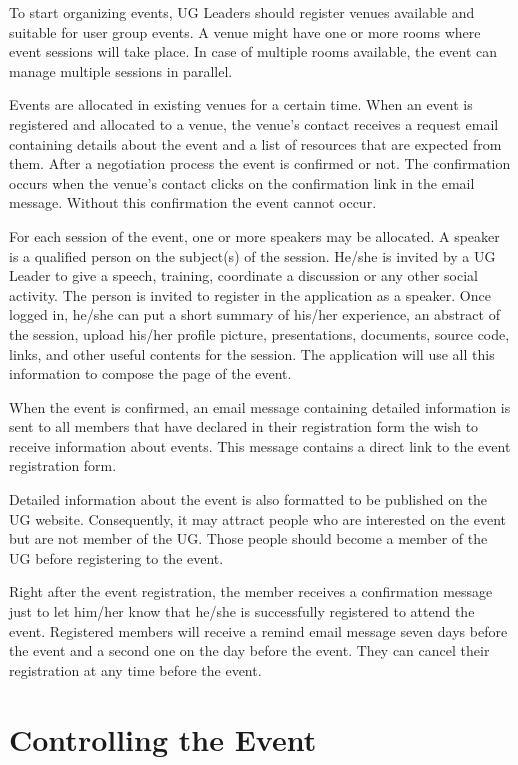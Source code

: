 \documentclass[envcountsame,envcountchap]{svmono}
\begin{document}
To start organizing events, UG Leaders should register venues available and suitable for user group events. A venue might have one or more rooms where event sessions will take place. In case of multiple rooms available, the event can manage multiple sessions in parallel.

Events are allocated in existing venues for a certain time. When an event is registered and allocated to a venue, the venue's contact receives a request email containing details about the event and a list of resources that are expected from them. After a negotiation process the event is confirmed or not. The confirmation occurs when the venue's contact clicks on the confirmation link in the email message. Without this confirmation the event cannot occur.

For each session of the event, one or more speakers may be allocated. A speaker is a qualified person on the subject(s) of the session. He/she is invited by a UG Leader to give a speech, training, coordinate a discussion or any other social activity. The person is invited to register in the application as a speaker.  Once logged in, he/she can put a short summary of his/her experience, an abstract of the session, upload his/her profile picture, presentations, documents, source code, links, and other useful contents for the session. The application will use all this information to compose the page of the event.

When the event is confirmed, an email message containing detailed information is sent to all members that have declared in their registration form the wish to receive information about events. This message contains a direct link to the event registration form.

Detailed information about the event is also formatted to be published on the UG website. Consequently, it may attract people who are interested on the event but are not member of the UG. Those people should become a member of the UG before registering to the event.

Right after the event registration, the member receives a confirmation message just to let him/her know that he/she is successfully registered to attend the event. Registered members will receive a remind email message seven days before the event and a second one on the day before the event. They can cancel their registration at any time before the event.

\section{Controlling the Event}
\end{document}
